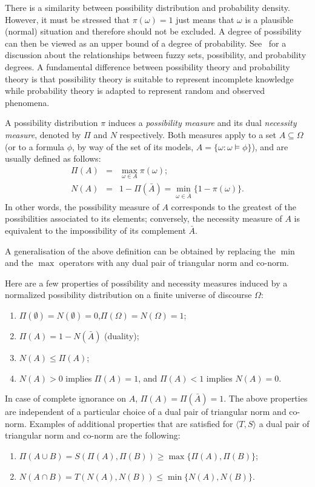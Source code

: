 \documentclass[review]{elsarticle}
\theoremstyle{definition}
\begin{document}
There is a similarity between possibility distribution and probability 
density. However, it must be stressed that $\pi(\omega) = 1$ just means that
$\omega$ is a plausible (normal) situation and therefore should not be excluded.
A degree of possibility can then be viewed as an upper bound of a degree of probability.
See~\cite{dubois1991} for a discussion
about the relationships between fuzzy sets, possibility, and probability 
degrees.
A fundamental difference between possibility theory and probability theory is that possibility theory is suitable to represent incomplete knowledge while 
probability theory is adapted to represent random and observed phenomena. 


A possibility distribution $\pi$ induces a \emph{possibility
measure} and its dual \emph{necessity
measure}, denoted by $\Pi$ and $N$
respectively. Both measures apply to a set $A \subseteq\Omega$ (or to a
formula $\phi$, by way of the set of its models, $A = \{\omega : \omega \models \phi\}$),
and are usually defined as follows:
\begin{eqnarray}
  \Pi(A) &=& \max_{\omega\in A} \pi(\omega); \\
  N(A)   &=& 1 - \Pi(\bar{A}) = \min_{\omega\in \bar{A}} \{1 - \pi(\omega)\}.
\end{eqnarray}
In other words, the possibility measure of $A$ corresponds to the
greatest of the possibilities associated to its elements; conversely,
the necessity measure of $A$ is equivalent to the impossibility of
its complement $\bar{A}$.

A generalisation of the above definition can be obtained by replacing the
$\min$ and the $\max$ operators with any dual pair of triangular
norm and co-norm.

Here are a few properties of possibility and necessity measures 
induced by a normalized possibility distribution on a finite universe of
discourse $\Omega$: 
\begin{enumerate}
  \item $\Pi(\emptyset) = N(\emptyset) = 0$,\quad $\Pi(\Omega) = N(\Omega) = 1$;
  \item $\Pi(A) = 1 - N(\bar{A})$ (duality);
  \item $N(A) \leq \Pi(A)$;
  \item $N(A) > 0$ implies $\Pi(A) = 1$, and $\Pi(A) < 1$ implies $N(A) = 0$.
\end{enumerate}
In case of complete ignorance on $A$, $\Pi(A) = \Pi(\bar{A}) = 1$.
The above properties are independent of a particular choice of a dual pair
of triangular norm and co-norm. Examples of additional properties that
are satisfied for $\langle T,S \rangle$ a dual pair of triangular norm and co-norm
are the following:
\begin{enumerate}
  \item $\Pi(A \cup B) = S(\Pi(A), \Pi(B)) \geq \max\{\Pi(A), \Pi(B)\}$;
  \item $N(A \cap B) = T(N(A), N(B)) \leq \min\{N(A), N(B)\}$.
\end{enumerate}
\end{document}
